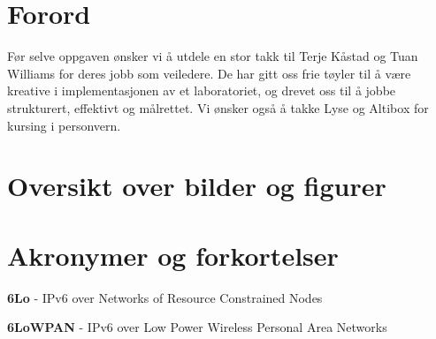 \documentclass{article}
\begin{document}
\vspace{4em}
 

\newpage
\section*{Forord}

Før selve oppgaven ønsker vi å utdele en stor takk til Terje Kåstad og Tuan Williams for deres jobb som veiledere. De har gitt oss frie tøyler til å være kreative i implementasjonen av et laboratoriet, og drevet oss til å jobbe strukturert, effektivt og målrettet. Vi ønsker også å takke Lyse og Altibox for kursing i personvern.

\newpage


\section*{Oversikt over bilder og figurer}

\listoffigures
 
\listoftables

\newpage




\section*{Akronymer og forkortelser}

\textbf{6Lo} - IPv6 over Networks of Resource Constrained Nodes
\newline

\textbf{6LoWPAN} - IPv6 over Low Power Wireless Personal Area Networks
\newline
\end{document}
